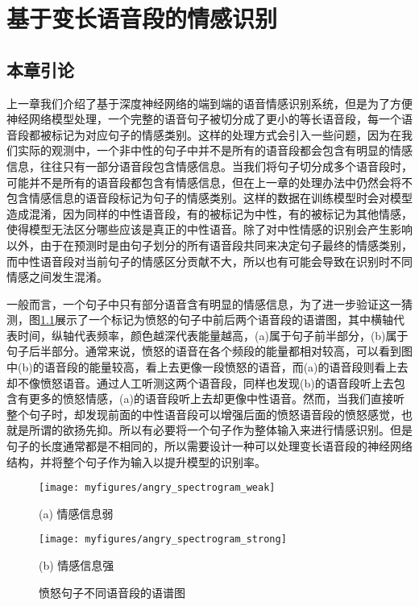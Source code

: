 \chapter{基于变长语音段的情感识别}
\label{cha:var_len}

\section{本章引论}
\label{sec:var_len_intro}

上一章我们介绍了基于深度神经网络的端到端的语音情感识别系统，但是为了方便神经网络模型处理，一个完整的语音句子被切分成了更小的等长语音段，每一个语音段都被标记为对应句子的情感类别。这样的处理方式会引入一些问题，因为在我们实际的观测中，一个非中性的句子中并不是所有的语音段都会包含有明显的情感信息，往往只有一部分语音段包含情感信息。当我们将句子切分成多个语音段时，可能并不是所有的语音段都包含有情感信息，但在上一章的处理办法中仍然会将不包含情感信息的语音段标记为句子的情感类别。这样的数据在训练模型时会对模型造成混淆，因为同样的中性语音段，有的被标记为中性，有的被标记为其他情感，使得模型无法区分哪些应该是真正的中性语音。除了对中性情感的识别会产生影响以外，由于在预测时是由句子划分的所有语音段共同来决定句子最终的情感类别，而中性语音段对当前句子的情感区分贡献不大，所以也有可能会导致在识别时不同情感之间发生混淆。

一般而言，一个句子中只有部分语音含有明显的情感信息，为了进一步验证这一猜测，图\ref{fig:angry_spectrogram}展示了一个标记为愤怒的句子中前后两个语音段的语谱图，其中横轴代表时间，纵轴代表频率，颜色越深代表能量越高，(a)属于句子前半部分，(b)属于句子后半部分。通常来说，愤怒的语音在各个频段的能量都相对较高，可以看到图中(b)的语音段的能量较高，看上去更像一段愤怒的语音，而(a)的语音段则看上去却不像愤怒语音。通过人工听测这两个语音段，同样也发现(b)的语音段听上去包含有更多的愤怒情感，(a)的语音段听上去却更像中性语音。然而，当我们直接听整个句子时，却发现前面的中性语音段可以增强后面的愤怒语音段的愤怒感觉，也就是所谓的欲扬先抑。所以有必要将一个句子作为整体输入来进行情感识别。但是句子的长度通常都是不相同的，所以需要设计一种可以处理变长语音段的神经网络结构，并将整个句子作为输入以提升模型的识别率。

\begin{figure}[htb]
\begin{minipage}{0.48\textwidth}
    \centering
    \texttt{[image: myfigures/angry\_spectrogram\_weak]}
    \centerline{(a) 情感信息弱}\medskip
\end{minipage}\hfill
\begin{minipage}{0.48\textwidth}
    \centering
    \texttt{[image: myfigures/angry\_spectrogram\_strong]}
    \centerline{(b) 情感信息强}\medskip
\end{minipage}
\caption{愤怒句子不同语音段的语谱图}
\label{fig:angry_spectrogram}
\end{figure}

